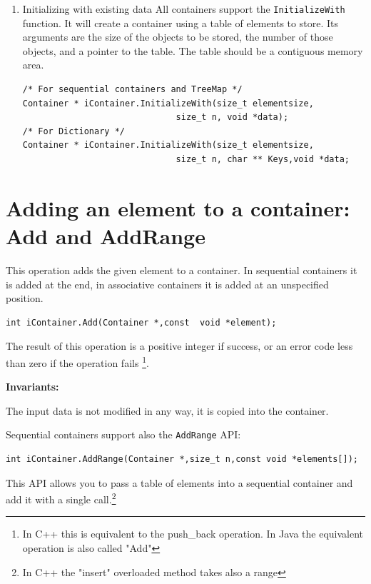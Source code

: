 \documentclass[12pt,a4paper]{memoir} %
\newcommand{\Const}{
{\par\noindent \textbf{Invariants:}\noindent}
}
\begin{document}
\begin{enumerate}
Problems with the above construct could arise because of the alignment requirements of the platform 
where the library is running. Instead of a \verb,char, as the type
of the buffer, it is better to use a slightly more complicated expression to ensure correct alignment. For instance:
\begin{verbatim}
 size_t s = (sizeof(void *)-1+iList.Sizeof(NULL))/sizeof(void *);
 void *listSpace[s];
\end{verbatim}

\item Initializing with existing data
All containers support the \verb,InitializeWith, function. It will create a container using a table of elements to store. Its arguments are the size of 
the objects to be stored, the number of those objects, and a pointer to the table. The table should be a contiguous memory area.
\begin{verbatim}
/* For sequential containers and TreeMap */
Container * iContainer.InitializeWith(size_t elementsize,
                              size_t n, void *data);
/* For Dictionary */
Container * iContainer.InitializeWith(size_t elementsize,
                              size_t n, char ** Keys,void *data;
\end{verbatim}


\end{enumerate}
\section{Adding an element to a container: Add and AddRange}
This operation adds the given element to a container. In sequential containers it is added at the end, in associative containers it is added at an unspecified position.
\begin{verbatim}
int iContainer.Add(Container *,const  void *element);
\end{verbatim}
The result of this operation is a positive integer if success, or an error code less than zero if the operation fails \footnote{In C++ this is equivalent to the push\_back operation. In Java the equivalent operation is also called "Add"}.
\Const The input data is not modified in any way, it is copied into the container.

Sequential containers support also the \texttt{AddRange} API:
\begin{verbatim}
int iContainer.AddRange(Container *,size_t n,const void *elements[]);
\end{verbatim}
This API allows you to pass a table of elements into a sequential container and add it with a single call.\footnote{In C++ the "insert" overloaded method takes also a range}
\end{document}
